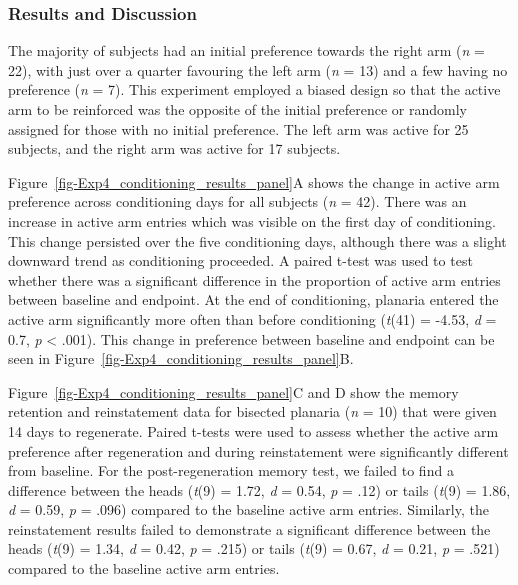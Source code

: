 \documentclass[
  jou,
  floatsintext,
  longtable,
  nolmodern,
  notxfonts,
  notimes,
  donotrepeattitle,
  colorlinks=true,linkcolor=blue,citecolor=blue,urlcolor=blue]{apa7}
\begin{document}
\subsubsection{Results and Discussion}\label{sec-results-and-discussion}

The majority of subjects had an initial preference towards the right arm
(\emph{n} = 22), with just over a quarter favouring the left arm
(\emph{n} = 13) and a few having no preference (\emph{n} = 7). This
experiment employed a biased design so that the active arm to be
reinforced was the opposite of the initial preference or randomly
assigned for those with no initial preference. The left arm was active
for 25 subjects, and the right arm was active for 17 subjects.

Figure~\ref{fig-Exp4_conditioning_results_panel}A shows the change in
active arm preference across conditioning days for all subjects
(\emph{n} = 42). There was an increase in active arm entries which was
visible on the first day of conditioning. This change persisted over the
five conditioning days, although there was a slight downward trend as
conditioning proceeded. A paired t-test was used to test whether there
was a significant difference in the proportion of active arm entries
between baseline and endpoint. At the end of conditioning, planaria
entered the active arm significantly more often than before conditioning
(\emph{t}(41) = -4.53, \emph{d} = 0.7, \emph{p} \textless{} .001). This
change in preference between baseline and endpoint can be seen in
Figure~\ref{fig-Exp4_conditioning_results_panel}B.

Figure~\ref{fig-Exp4_conditioning_results_panel}C and D show the memory
retention and reinstatement data for bisected planaria (\emph{n} = 10)
that were given 14 days to regenerate. Paired t-tests were used to
assess whether the active arm preference after regeneration and during
reinstatement were significantly different from baseline. For the
post-regeneration memory test, we failed to find a difference between
the heads (\emph{t}(9) = 1.72, \emph{d} = 0.54, \emph{p} = .12) or tails
(\emph{t}(9) = 1.86, \emph{d} = 0.59, \emph{p} = .096) compared to the
baseline active arm entries. Similarly, the reinstatement results failed
to demonstrate a significant difference between the heads (\emph{t}(9) =
1.34, \emph{d} = 0.42, \emph{p} = .215) or tails (\emph{t}(9) = 0.67,
\emph{d} = 0.21, \emph{p} = .521) compared to the baseline active arm
entries.
\end{document}
